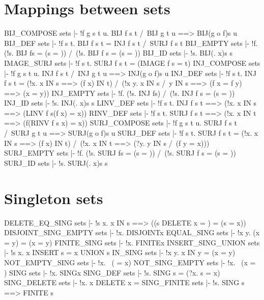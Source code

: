 \section{Mappings between sets}
\THEOREM BIJ\_COMPOSE sets
|- !f g s t u. BIJ f s t /\ BIJ g t u ==> BIJ(g o f)s u
\ENDTHEOREM
\THEOREM BIJ\_DEF sets
|- !f s t. BIJ f s t = INJ f s t /\ SURJ f s t
\ENDTHEOREM
\THEOREM BIJ\_EMPTY sets
|- !f. (!s. BIJ f{}s = (s = {})) /\ (!s. BIJ f s{} = (s = {}))
\ENDTHEOREM
\THEOREM BIJ\_ID sets
|- !s. BIJ(\x. x)s s
\ENDTHEOREM
\THEOREM IMAGE\_SURJ sets
|- !f s t. SURJ f s t = (IMAGE f s = t)
\ENDTHEOREM
\THEOREM INJ\_COMPOSE sets
|- !f g s t u. INJ f s t /\ INJ g t u ==> INJ(g o f)s u
\ENDTHEOREM
\THEOREM INJ\_DEF sets
|- !f s t.
    INJ f s t =
    (!x. x IN s ==> (f x) IN t) /\
    (!x y. x IN s /\ y IN s ==> (f x = f y) ==> (x = y))
\ENDTHEOREM
\THEOREM INJ\_EMPTY sets
|- !f. (!s. INJ f{}s) /\ (!s. INJ f s{} = (s = {}))
\ENDTHEOREM
\THEOREM INJ\_ID sets
|- !s. INJ(\x. x)s s
\ENDTHEOREM
\THEOREM LINV\_DEF sets
|- !f s t. INJ f s t ==> (!x. x IN s ==> (LINV f s(f x) = x))
\ENDTHEOREM
\THEOREM RINV\_DEF sets
|- !f s t. SURJ f s t ==> (!x. x IN t ==> (f(RINV f s x) = x))
\ENDTHEOREM
\THEOREM SURJ\_COMPOSE sets
|- !f g s t u. SURJ f s t /\ SURJ g t u ==> SURJ(g o f)s u
\ENDTHEOREM
\THEOREM SURJ\_DEF sets
|- !f s t.
    SURJ f s t =
    (!x. x IN s ==> (f x) IN t) /\
    (!x. x IN t ==> (?y. y IN s /\ (f y = x)))
\ENDTHEOREM
\THEOREM SURJ\_EMPTY sets
|- !f. (!s. SURJ f{}s = (s = {})) /\ (!s. SURJ f s{} = (s = {}))
\ENDTHEOREM
\THEOREM SURJ\_ID sets
|- !s. SURJ(\x. x)s s
\ENDTHEOREM
\section{Singleton sets}
\THEOREM DELETE\_EQ\_SING sets
|- !s x. x IN s ==> ((s DELETE x = {}) = (s = {x}))
\ENDTHEOREM
\THEOREM DISJOINT\_SING\_EMPTY sets
|- !x. DISJOINT{x}{}
\ENDTHEOREM
\THEOREM EQUAL\_SING sets
|- !x y. ({x} = {y}) = (x = y)
\ENDTHEOREM
\THEOREM FINITE\_SING sets
|- !x. FINITE{x}
\ENDTHEOREM
\THEOREM INSERT\_SING\_UNION sets
|- !s x. x INSERT s = {x} UNION s
\ENDTHEOREM
\THEOREM IN\_SING sets
|- !x y. x IN {y} = (x = y)
\ENDTHEOREM
\THEOREM NOT\_EMPTY\_SING sets
|- !x. ~({} = {x})
\ENDTHEOREM
\THEOREM NOT\_SING\_EMPTY sets
|- !x. ~({x} = {})
\ENDTHEOREM
\THEOREM SING sets
|- !x. SING{x}
\ENDTHEOREM
\THEOREM SING\_DEF sets
|- !s. SING s = (?x. s = {x})
\ENDTHEOREM
\THEOREM SING\_DELETE sets
|- !x. {x} DELETE x = {}
\ENDTHEOREM
\THEOREM SING\_FINITE sets
|- !s. SING s ==> FINITE s
\ENDTHEOREM
